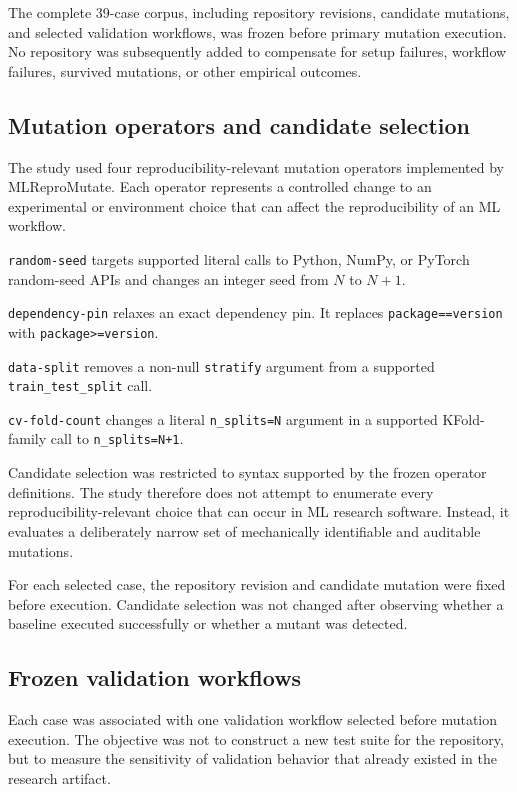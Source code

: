 The complete 39-case corpus, including repository revisions, candidate
mutations, and selected validation workflows, was frozen before primary
mutation execution. No repository was subsequently added to compensate for
setup failures, workflow failures, survived mutations, or other empirical
outcomes.


\subsection{Mutation operators and candidate selection}
\label{sec:mutation-operators}

The study used four reproducibility-relevant mutation operators implemented by
MLReproMutate. Each operator represents a controlled change to an experimental
or environment choice that can affect the reproducibility of an ML workflow.

\texttt{random-seed} targets supported literal calls to Python, NumPy, or
PyTorch random-seed APIs and changes an integer seed from \(N\) to \(N+1\).

\texttt{dependency-pin} relaxes an exact dependency pin. It replaces
\texttt{package}\allowbreak\texttt{==}\allowbreak\texttt{version} with
\texttt{package}\allowbreak\texttt{>=}\allowbreak\texttt{version}.

\texttt{data-split} removes a non-null \texttt{stratify} argument from a
supported \texttt{train\_test\_split} call.

\texttt{cv-fold-count} changes a literal \texttt{n\_splits=N} argument in a
supported KFold-family call to \texttt{n\_splits=N+1}.

Candidate selection was restricted to syntax supported by the frozen operator
definitions. The study therefore does not attempt to enumerate every
reproducibility-relevant choice that can occur in ML research software.
Instead, it evaluates a deliberately narrow set of mechanically identifiable
and auditable mutations.

For each selected case, the repository revision and candidate mutation were
fixed before execution. Candidate selection was not changed after observing
whether a baseline executed successfully or whether a mutant was detected.


\subsection{Frozen validation workflows}
\label{sec:validation-workflows}

Each case was associated with one validation workflow selected before mutation
execution. The objective was not to construct a new test suite for the
repository, but to measure the sensitivity of validation behavior that already
existed in the research artifact.

